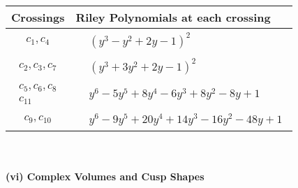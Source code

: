 \documentclass[1p]{elsarticle_modified}
\theoremstyle{definition}
\begin{document}
\begin{tabular}{m{50pt}|m{274pt}}
Crossings & \hspace{64pt}Riley Polynomials at each crossing \\
\hline $$\begin{aligned}c_{1},c_{4}\end{aligned}$$&$\begin{aligned}
&(y^3- y^2+2 y-1)^2
\end{aligned}$\\
\hline $$\begin{aligned}c_{2},c_{3},c_{7}\end{aligned}$$&$\begin{aligned}
&(y^3+3 y^2+2 y-1)^2
\end{aligned}$\\
\hline $$\begin{aligned}c_{5},c_{6},c_{8}\\c_{11}\end{aligned}$$&$\begin{aligned}
&y^6-5 y^5+8 y^4-6 y^3+8 y^2-8 y+1
\end{aligned}$\\
\hline $$\begin{aligned}c_{9},c_{10}\end{aligned}$$&$\begin{aligned}
&y^6-9 y^5+20 y^4+14 y^3-16 y^2-48 y+1
\end{aligned}$\\
\hline
\end{tabular}\\~\\
\newpage\flushleft \textbf{(vi) Complex Volumes and Cusp Shapes}
\end{document}
